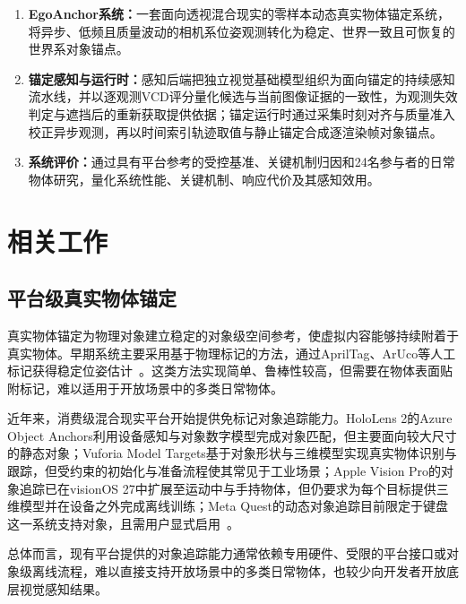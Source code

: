 \documentclass[review]{vgtc}
\begin{document}
\begin{enumerate}
  \item \textbf{EgoAnchor系统：}一套面向透视混合现实的零样本动态真实物体锚定系统，将异步、低频且质量波动的相机系位姿观测转化为稳定、世界一致且可恢复的世界系对象锚点。

  \item \textbf{锚定感知与运行时：}感知后端把独立视觉基础模型组织为面向锚定的持续感知流水线，并以逐观测VCD评分量化候选与当前图像证据的一致性，为观测失效判定与遮挡后的重新获取提供依据；锚定运行时通过采集时刻对齐与质量准入校正异步观测，再以时间索引轨迹取值与静止锚定合成逐渲染帧对象锚点。

  \item \textbf{系统评价：}通过具有平台参考的受控基准、关键机制归因和24名参与者的日常物体研究，量化系统性能、关键机制、响应代价及其感知效用。
\end{enumerate}

\section{相关工作}\label{sec:related-work}

\subsection{平台级真实物体锚定}

真实物体锚定为物理对象建立稳定的对象级空间参考，使虚拟内容能够持续附着于真实物体。早期系统主要采用基于物理标记的方法，通过AprilTag、ArUco等人工标记获得稳定位姿估计~\cite{kato1999artoolkit,olson2011apriltag,garridojurado2014aruco}。这类方法实现简单、鲁棒性较高，但需要在物体表面贴附标记，难以适用于开放场景中的多类日常物体。

近年来，消费级混合现实平台开始提供免标记对象追踪能力。HoloLens 2的Azure Object Anchors利用设备感知与对象数字模型完成对象匹配，但主要面向较大尺寸的静态对象；Vuforia Model Targets基于对象形状与三维模型实现真实物体识别与跟踪，但受约束的初始化与准备流程使其常见于工业场景；Apple Vision Pro的对象追踪已在visionOS 27中扩展至运动中与手持物体，但仍要求为每个目标提供三维模型并在设备之外完成离线训练；Meta Quest的动态对象追踪目前限定于键盘这一系统支持对象，且需用户显式启用~\cite{appleObjectAnchor,appleObjectTracking2026,azureObjectAnchors,vuforiaModelTargets,metaDynamicObjectTracker}。

总体而言，现有平台提供的对象追踪能力通常依赖专用硬件、受限的平台接口或对象级离线流程，难以直接支持开放场景中的多类日常物体，也较少向开发者开放底层视觉感知结果。
\end{document}
